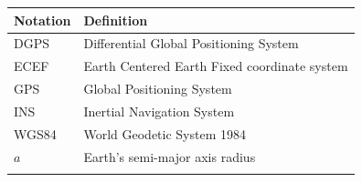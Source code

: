 \documentclass[
]{book}
\begin{document}
\begin{longtable}[]{@{}ll@{}}
\toprule
\begin{minipage}[b]{0.43\columnwidth}\raggedright
Notation\strut
\end{minipage} & \begin{minipage}[b]{0.51\columnwidth}\raggedright
Definition\strut
\end{minipage}\tabularnewline
\midrule
\endhead
\begin{minipage}[t]{0.43\columnwidth}\raggedright
DGPS\strut
\end{minipage} & \begin{minipage}[t]{0.51\columnwidth}\raggedright
Differential Global Positioning System\strut
\end{minipage}\tabularnewline
\begin{minipage}[t]{0.43\columnwidth}\raggedright
ECEF\strut
\end{minipage} & \begin{minipage}[t]{0.51\columnwidth}\raggedright
Earth Centered Earth Fixed coordinate system\strut
\end{minipage}\tabularnewline
\begin{minipage}[t]{0.43\columnwidth}\raggedright
GPS\strut
\end{minipage} & \begin{minipage}[t]{0.51\columnwidth}\raggedright
Global Positioning System\strut
\end{minipage}\tabularnewline
\begin{minipage}[t]{0.43\columnwidth}\raggedright
INS\strut
\end{minipage} & \begin{minipage}[t]{0.51\columnwidth}\raggedright
Inertial Navigation System\strut
\end{minipage}\tabularnewline
\begin{minipage}[t]{0.43\columnwidth}\raggedright
WGS84\strut
\end{minipage} & \begin{minipage}[t]{0.51\columnwidth}\raggedright
World Geodetic System 1984\strut
\end{minipage}\tabularnewline
\begin{minipage}[t]{0.43\columnwidth}\raggedright
\(a\)\strut
\end{minipage} & \begin{minipage}[t]{0.51\columnwidth}\raggedright
Earth's semi-major axis radius\strut
\end{minipage}\tabularnewline
\begin{minipage}[t]{0.43\columnwidth}\raggedright

\end{minipage}
\end{longtable}
\end{document}
